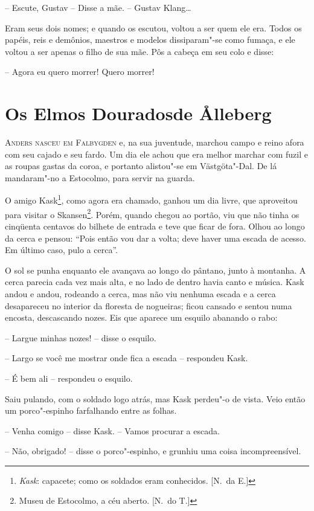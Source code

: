 -- Escute, Gustav -- Disse a mãe. -- Gustav Klang\ldots{}

Eram seus dois nomes; e quando os escutou, voltou a ser quem ele era.
Todos os papéis, reis e demônios, maestros e modelos dissiparam"-se
como fumaça, e ele voltou a ser apenas o filho de sua mãe. Pôs a cabeça
em seu colo e disse:

-- Agora eu quero morrer! Quero morrer!

\chapter[Os Elmos Dourados de \r Alleberg]{Os Elmos Dourados\break de \r Alleberg}


\textsc{Anders nasceu em Falbygden} e, na sua juventude, marchou campo e reino
afora com seu cajado e seu fardo. Um dia ele achou que era melhor
marchar com fuzil e as roupas gastas da coroa, e portanto alistou"-se
em Västgöta"-Dal. De lá mandaram"-no a Estocolmo, para servir na guarda.

O amigo Kask\footnote{ \textit{Kask}: capacete; como os soldados eram
conhecidos. [N.~da E.]}, como agora era chamado, ganhou um dia livre, que
aproveitou para visitar o Skansen\footnote{ Museu de Estocolmo, a céu
aberto. [N.~do T.]}. Porém, quando chegou ao portão, viu que não tinha os
cinqüenta centavos do bilhete de entrada e teve que ficar de fora.
Olhou ao longo da cerca e pensou: ``Pois então vou dar a volta; deve
haver uma escada de acesso. Em último caso, pulo a cerca''.

O sol se punha enquanto ele avançava ao longo do pântano, junto à
montanha. A cerca parecia cada vez mais alta, e no lado de dentro havia
canto e música. Kask andou e andou, rodeando a cerca, mas não viu
nenhuma escada e a cerca desapareceu no interior da floresta de
nogueiras; ficou cansado e sentou numa encosta, descascando nozes. Eis
que aparece um esquilo abanando o rabo:

-- Largue minhas nozes! -- disse o esquilo.

-- Largo se você me mostrar onde fica a escada -- respondeu Kask.

-- É bem ali -- respondeu o esquilo.

Saiu pulando, com o soldado logo atrás, mas Kask perdeu"-o de vista.
Veio então um porco"-espinho farfalhando entre as folhas.

-- Venha comigo -- disse Kask. -- Vamos procurar a escada.

-- Não, obrigado! -- disse o porco"-espinho, e grunhiu uma coisa
incompreensível.

